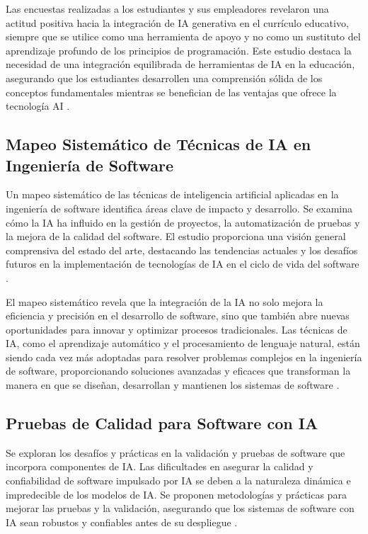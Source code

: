 Las encuestas realizadas a los estudiantes y sus empleadores revelaron una actitud positiva hacia la integración de IA generativa en el currículo educativo, siempre que se utilice como una herramienta de apoyo y no como un sustituto del aprendizaje profundo de los principios de programación. Este estudio destaca la necesidad de una integración equilibrada de herramientas de IA en la educación, asegurando que los estudiantes desarrollen una comprensión sólida de los conceptos fundamentales mientras se benefician de las ventajas que ofrece la tecnología AI \cite{Petrovska2023}.

\subsection{Mapeo Sistemático de Técnicas de IA en Ingeniería de Software}

Un mapeo sistemático de las técnicas de inteligencia artificial aplicadas en la ingeniería de software identifica áreas clave de impacto y desarrollo. Se examina cómo la IA ha influido en la gestión de proyectos, la automatización de pruebas y la mejora de la calidad del software. El estudio proporciona una visión general comprensiva del estado del arte, destacando las tendencias actuales y los desafíos futuros en la implementación de tecnologías de IA en el ciclo de vida del software \cite{Sofian2022}.

El mapeo sistemático revela que la integración de la IA no solo mejora la eficiencia y precisión en el desarrollo de software, sino que también abre nuevas oportunidades para innovar y optimizar procesos tradicionales. Las técnicas de IA, como el aprendizaje automático y el procesamiento de lenguaje natural, están siendo cada vez más adoptadas para resolver problemas complejos en la ingeniería de software, proporcionando soluciones avanzadas y eficaces que transforman la manera en que se diseñan, desarrollan y mantienen los sistemas de software \cite{Sofian2022}.

\subsection{Pruebas de Calidad para Software con IA}

Se exploran los desafíos y prácticas en la validación y pruebas de software que incorpora componentes de IA. Las dificultades en asegurar la calidad y confiabilidad de software impulsado por IA se deben a la naturaleza dinámica e impredecible de los modelos de IA. Se proponen metodologías y prácticas para mejorar las pruebas y la validación, asegurando que los sistemas de software con IA sean robustos y confiables antes de su despliegue \cite{Tao2019}.

